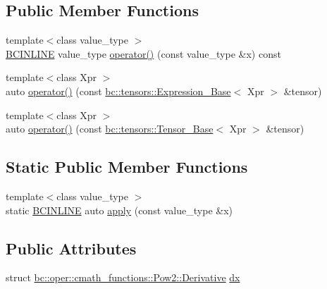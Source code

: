 \subsection*{Public Member Functions}
\begin{DoxyCompactItemize}
\item 
{\footnotesize template$<$class value\+\_\+type $>$ }\\\hyperlink{common_8h_a6699e8b0449da5c0fafb878e59c1d4b1}{B\+C\+I\+N\+L\+I\+NE} value\+\_\+type \hyperlink{structbc_1_1oper_1_1cmath__functions_1_1Pow2_a8a8192d1d6dc40f9bdc9cbb02c1c8578}{operator()} (const value\+\_\+type \&x) const
\item 
{\footnotesize template$<$class Xpr $>$ }\\auto \hyperlink{structbc_1_1oper_1_1cmath__functions_1_1Pow2_a42f2394b4de854c51f0eb0aa5b8fdaa7}{operator()} (const \hyperlink{classbc_1_1tensors_1_1Expression__Base}{bc\+::tensors\+::\+Expression\+\_\+\+Base}$<$ Xpr $>$ \&tensor)
\item 
{\footnotesize template$<$class Xpr $>$ }\\auto \hyperlink{structbc_1_1oper_1_1cmath__functions_1_1Pow2_a88b5e3374d6f1286c9d3f9e6f4f1c9de}{operator()} (const \hyperlink{classbc_1_1tensors_1_1Tensor__Base}{bc\+::tensors\+::\+Tensor\+\_\+\+Base}$<$ Xpr $>$ \&tensor)
\end{DoxyCompactItemize}
\subsection*{Static Public Member Functions}
\begin{DoxyCompactItemize}
\item 
{\footnotesize template$<$class value\+\_\+type $>$ }\\static \hyperlink{common_8h_a6699e8b0449da5c0fafb878e59c1d4b1}{B\+C\+I\+N\+L\+I\+NE} auto \hyperlink{structbc_1_1oper_1_1cmath__functions_1_1Pow2_a7a8e59467ac5b0c23b0250d5685af53b}{apply} (const value\+\_\+type \&x)
\end{DoxyCompactItemize}
\subsection*{Public Attributes}
\begin{DoxyCompactItemize}
\item 
struct \hyperlink{structbc_1_1oper_1_1cmath__functions_1_1Pow2_1_1Derivative}{bc\+::oper\+::cmath\+\_\+functions\+::\+Pow2\+::\+Derivative} \hyperlink{structbc_1_1oper_1_1cmath__functions_1_1Pow2_a1fc55691db97f9b427695ab14c1d4b13}{dx}
\end{DoxyCompactItemize}


